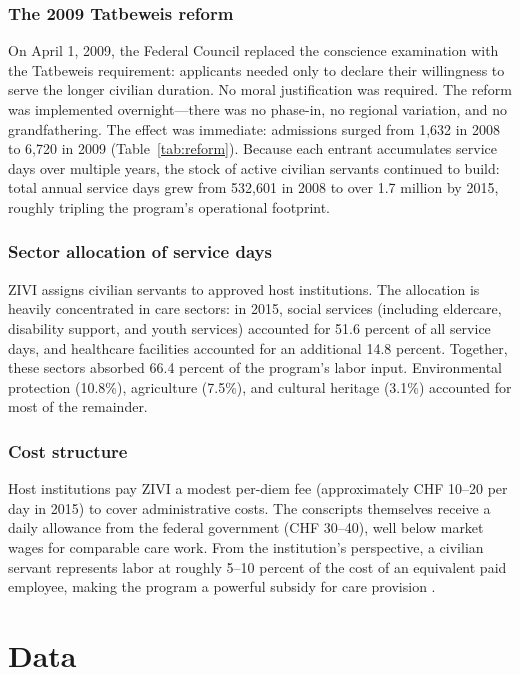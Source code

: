 \documentclass[12pt]{article}
\begin{document}
\subsubsection*{The 2009 Tatbeweis reform} On April 1, 2009, the Federal Council replaced the conscience examination with the Tatbeweis requirement: applicants needed only to declare their willingness to serve the longer civilian duration. No moral justification was required. The reform was implemented overnight---there was no phase-in, no regional variation, and no grandfathering. The effect was immediate: admissions surged from 1,632 in 2008 to 6,720 in 2009 (Table~\ref{tab:reform}). Because each entrant accumulates service days over multiple years, the stock of active civilian servants continued to build: total annual service days grew from 532,601 in 2008 to over 1.7 million by 2015, roughly tripling the program's operational footprint.

\subsubsection*{Sector allocation of service days} ZIVI assigns civilian servants to approved host institutions. The allocation is heavily concentrated in care sectors: in 2015, social services (including eldercare, disability support, and youth services) accounted for 51.6 percent of all service days, and healthcare facilities accounted for an additional 14.8 percent. Together, these sectors absorbed 66.4 percent of the program's labor input. Environmental protection (10.8\%), agriculture (7.5\%), and cultural heritage (3.1\%) accounted for most of the remainder.

\subsubsection*{Cost structure} Host institutions pay ZIVI a modest per-diem fee (approximately CHF 10--20 per day in 2015) to cover administrative costs. The conscripts themselves receive a daily allowance from the federal government (CHF 30--40), well below market wages for comparable care work. From the institution's perspective, a civilian servant represents labor at roughly 5--10 percent of the cost of an equivalent paid employee, making the program a powerful subsidy for care provision \citep{zivi2016}.

\section{Data}
\end{document}
